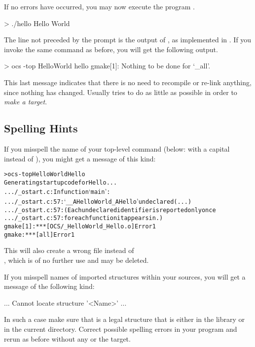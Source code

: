 If no errors have occurred, you may now execute the program .

\begin{prog}
> ./hello
Hello World
\end{prog}

The line not preceded by the prompt is the output of , as
implemented in .  
If you invoke the same  command as before, you will get the
following output.

\begin{prog}
> ocs -top HelloWorld hello
  gmake[1]: Nothing to be done for `_all'.
\end{prog}

This last message indicates that there is no need to recompile or re-link
anything, since nothing has changed. Usually  tries to do as
little as possible in order to \emph{make a target}. 

\subsection{Spelling Hints}

If you misspell the name of your top-level command (below:  with
a capital 
instead of ), you might get a message of this
kind:

{\small \begin{alltt}
> ocs -top HelloWorld Hello
Generating startup code for Hello ...
.../_ostart.c: In function `main':
.../_ostart.c:57: `__AHelloWorld_AHello' undeclared (...)
.../_ostart.c:57: (Each undeclared identifier is reported only once
.../_ostart.c:57: for each function it appears in.)
gmake[1]: *** [OCS/_HelloWorld_Hello.o] Error 1
gmake: *** [all] Error 1
\end{alltt}}
This will also create a wrong file  instead of \\
, which is of no further use and may be deleted.

If you misspell names of imported structures within your \opal{} sources, you
will get a message of the following kind: 

\begin{prog}
...
  Cannot locate structure '<Name>'
...
\end{prog}
In such a case make sure that  is a legal \opal{} structure that is
either in the library or in the current directory. Correct possible spelling
errors in your program and rerun  as before without any or the
 target. 


